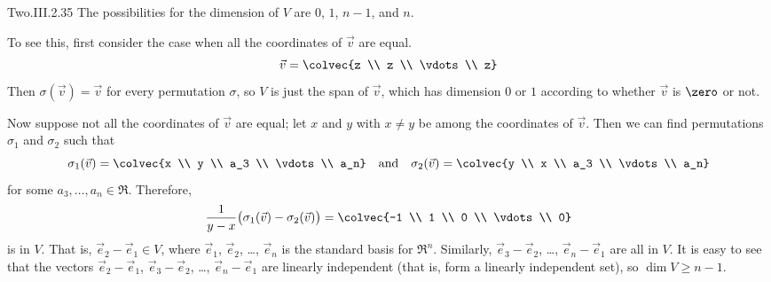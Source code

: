 \begin{ans}{Two.III.2.35}
      The possibilities for the dimension of $V$ are $0$, $1$, $n-1$,
      and $n$.

      To see this, first consider the case when all the coordinates of
      $\vec{v}$ are equal.
      \begin{equation*}
         \vec{v}=\colvec{z \\ z \\ \vdots \\ z}
      \end{equation*}
      Then $\sigma(\vec{v})=\vec{v}$ for every permutation $\sigma$, so
      $V$ is just the span of $\vec{v}$, which has dimension $0$ or $1$
      according to whether $\vec{v}$ is $\zero$ or not.

      Now suppose not all the coordinates of $\vec{v}$ are equal; let $x$
      and $y$ with $x\neq y$ be among the coordinates of $\vec{v}$.
      Then we can find permutations $\sigma_1$ and $\sigma_2$ such that
      \begin{equation*}
        \sigma_1(\vec{v})=\colvec{x \\ y \\ a_3 \\ \vdots \\ a_n}
        \quad\text{and}\quad
        \sigma_2(\vec{v})=\colvec{y \\ x \\ a_3 \\ \vdots \\ a_n}
      \end{equation*}
      for some $a_3,\ldots,a_n\in\Re$.
      Therefore,
      \begin{equation*}
        \frac{1}{y-x}\bigl(\sigma_1(\vec{v})-\sigma_2(\vec{v})\bigr)=
        \colvec{-1 \\ 1 \\ 0 \\ \vdots \\ 0}
      \end{equation*}
      is in $V$.
      That is, $\vec{e}_2-\vec{e}_1\in V$, where $\vec{e}_1$, $\vec{e}_2$,
      \ldots, $\vec{e}_n$ is the standard basis for $\Re^n$.
      Similarly, $\vec{e}_3-\vec{e}_2$, \ldots, $\vec{e}_n-\vec{e}_1$
      are all in $V$.
      It is easy to see that the vectors
      $\vec{e}_2-\vec{e}_1$, $\vec{e}_3-\vec{e}_2$, \ldots,
      $\vec{e}_n-\vec{e}_1$ are linearly independent (that is, form a linearly
      independent set), so $\dim V\geq n-1$.


\end{ans}
